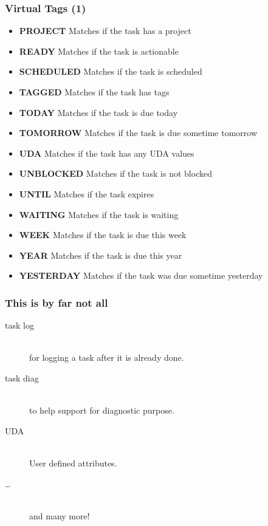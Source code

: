\documentclass[t,handout]{beamer}
\begin{document}
\begin{frame}[fragile]\frametitle{Virtual Tags (1)}
    \begin{itemize}
        \item \textbf{PROJECT}      Matches if the task has a project
        \item \textbf{READY}        Matches if the task is actionable
        \item \textbf{SCHEDULED}    Matches if the task is scheduled
        \item \textbf{TAGGED}       Matches if the task has tags
        \item \textbf{TODAY}        Matches if the task is due today
        \item \textbf{TOMORROW}     Matches if the task is due sometime tomorrow
        \item \textbf{UDA}          Matches if the task has any UDA values
        \item \textbf{UNBLOCKED}    Matches if the task is not blocked
        \item \textbf{UNTIL}        Matches if the task expires
        \item \textbf{WAITING}      Matches if the task is waiting
        \item \textbf{WEEK}         Matches if the task is due this week
        \item \textbf{YEAR}         Matches if the task is due this year
        \item \textbf{YESTERDAY}    Matches if the task was due sometime yesterday
    \end{itemize}
\end{frame}

\begin{frame}[fragile]\frametitle{This is by far not all}
    \begin{description}
        \item[task log] \hfill \\
            for logging a task after it is already done.
        \item[task diag] \hfill \\
            to help support for diagnostic purpose.
        \item[UDA] \hfill \\
            User defined attributes.
        \item[\ldots] \hfill \\
            and many more!
    \end{description}
\end{frame}
\end{document}
